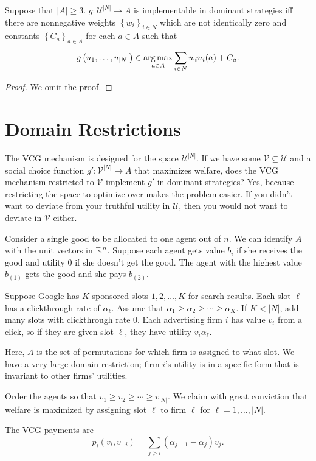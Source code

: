 \begin{theorem}[Roberts'] \label{4-8-3}
	Suppose that $\left| A \right| \ge 3$. $g: \mathscr{U}^{\left| N \right|} \to A$ is implementable in dominant strategies iff there are nonnegative weights $\left\{w_i\right\}_{i \in N}$ which are not identically zero and constants $\left\{C_a\right\}_{a \in A}$ for each $a \in A$ such that 
	\[
		g\left( u_1,\ldots,u_{\left| N \right|} \right) \in \operatorname*{arg\,max}_{ a\in A} \sum\limits_{i\in N}^{} w_i u_i(a) + C_a
	.\] 
\end{theorem}

\begin{proof}
	We omit the proof.
\end{proof}

\section{Domain Restrictions}

The VCG mechanism is designed for the space $\mathscr{U}^{\left| N \right|}$. If we have some $\mathscr{V} \subseteq \mathscr{U}$ and a social choice function $g' : \mathscr{V}^{\left| N \right|} \to A$ that maximizes welfare, does the VCG mechanism restricted to $\mathscr{V}$ implement $g'$ in dominant strategies?
Yes, because restricting the space to optimize over makes the problem easier. If you didn't want to deviate from your truthful utility in $\mathscr{U}$, then you would not want to deviate in $\mathscr{V}$ either.

\begin{example}
	Consider a single good to be allocated to one agent out of $n$. We can identify $A$ with the unit vectors in $\mathbb{R}^n$.
	Suppose each agent gets value $b_i$ if she receives the good and utility $0$ if she doesn't get the good.
	The agent with the highest value $b_{(1)}$ gets the good and she pays $b_{(2)}$.
\end{example}

\begin{example}
	Suppose Google has $K$ sponsored slots $1,2,\ldots,K$ for search results.
	Each slot $\ell$ has a clickthrough rate of $\alpha_\ell$. Assume that $\alpha_1 \ge \alpha_2 \ge \cdots \ge \alpha_K$.
	If $K < \left| N \right|$, add many slots with clickthrough rate $0$.
	Each advertising firm $i$ has value $v_i$ from a click, so if they are given slot $\ell$, they have utility $v_i \alpha_\ell$.

	Here, $A$ is the set of permutations for which firm is assigned to what slot.
	We have a very large domain restriction; firm $i$'s utility is in a specific form that is invariant to other firms' utilities.

	Order the agents so that $v_1 \ge v_2 \ge \cdots \ge v_{\left| N \right|}$. 
	We claim with great conviction that welfare is maximized by assigning slot $\ell$ to firm $\ell$ for $\ell = 1,\ldots,\left| N \right|$.
	
	The VCG payments are \[
		p_i\left( v_i, v_{-i} \right) = \sum_{j > i} \left( \alpha_{j-1} - \alpha_j \right) v_j
	.\] 
\end{example}

